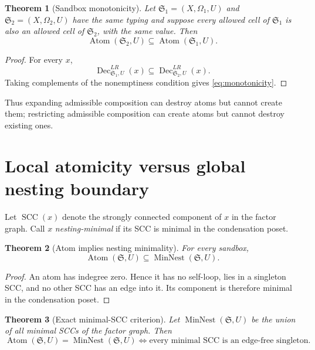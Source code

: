 \documentclass[11pt]{article}
\newtheorem{theorem}{Theorem}[section]
\theoremstyle{definition}
\theoremstyle{remark}
\newcommand{\Sbx}{\mathfrak S}
\newcommand{\Atom}{\operatorname{Atom}}
\newcommand{\Dec}{\operatorname{Dec}}
\newcommand{\MinNest}{\operatorname{MinNest}}
\begin{document}
\begin{theorem}[Sandbox monotonicity]
Let \(\Sbx_1=(X,\Omega_1,U)\) and \(\Sbx_2=(X,\Omega_2,U)\) have the same typing and suppose every allowed cell of \(\Sbx_1\) is also an allowed cell of \(\Sbx_2\), with the same value. Then
\begin{equation}
\boxed{\Atom(\Sbx_2,U)\subseteq\Atom(\Sbx_1,U).}
\label{eq:monotonicity}
\end{equation}
\end{theorem}

\begin{proof}
For every \(x\),
\[
\Dec^{LR}_{\Sbx_1,U}(x)\subseteq \Dec^{LR}_{\Sbx_2,U}(x).
\]
Taking complements of the nonemptiness condition gives \eqref{eq:monotonicity}.
\end{proof}

Thus expanding admissible composition can destroy atoms but cannot create them; restricting admissible composition can create atoms but cannot destroy existing ones.

\section{Local atomicity versus global nesting boundary}

Let \(\operatorname{SCC}(x)\) denote the strongly connected component of \(x\) in the factor graph. Call \(x\) \emph{nesting-minimal} if its SCC is minimal in the condensation poset.

\begin{theorem}[Atom implies nesting minimality]
For every sandbox,
\begin{equation}
\boxed{\Atom(\Sbx,U)\subseteq\MinNest(\Sbx,U).}
\label{eq:atommin}
\end{equation}
\end{theorem}

\begin{proof}
An atom has indegree zero. Hence it has no self-loop, lies in a singleton SCC, and no other SCC has an edge into it. Its component is therefore minimal in the condensation poset.
\end{proof}

\begin{theorem}[Exact minimal-SCC criterion]
Let \(\MinNest(\Sbx,U)\) be the union of all minimal SCCs of the factor graph. Then
\begin{equation}
\boxed{
\Atom(\Sbx,U)=\MinNest(\Sbx,U)
\iff
\text{every minimal SCC is an edge-free singleton}.}
\label{eq:scccriterion}
\end{equation}
\end{theorem}
\end{document}
